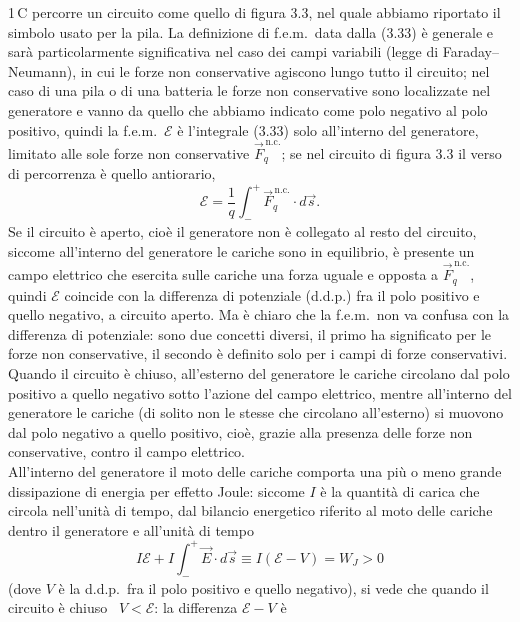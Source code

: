 1\,C percorre un circuito come quello di figura 3.3, nel quale abbiamo riportato
il simbolo usato per la pila.
La definizione di f.e.m.\ data dalla (3.33) \`e generale e sar\`a
particolarmente significativa nel caso dei campi variabili (legge di
Faraday--Neumann), in cui le forze non conservative agiscono lungo tutto il
circuito; nel caso di una pila o di una batteria le forze non conservative sono
localizzate nel generatore e vanno da quello che abbiamo indicato come polo
negativo al polo positivo, quindi la f.e.m.\ $\mathcal E$ \`e l'integrale (3.33)
solo all'interno del generatore, limitato alle sole forze non conservative
$\vec F_q^{\,\mathrm{n.c.}}$; se nel circuito di figura 3.3 il verso di
percorrenza \`e quello antiorario,
\begin{equation}
  \mathcal E=\frac1q\int_-^+\vec F_q^{\,\mathrm{n.c.}}\cdot d\vec s.
  \tag{3.34}
\end{equation}
Se il circuito \`e aperto, cio\`e il generatore non \`e collegato al resto del
circuito, siccome all'interno del generatore le cariche sono in equilibrio, \`e
presente un campo elettrico che esercita sulle cariche una forza uguale e
opposta a $\vec F_q^{\,\mathrm{n.c.}}$, quindi $\mathcal E$ coincide con la
differenza di potenziale (d.d.p.) fra il polo positivo e quello negativo, a
circuito aperto. Ma \`e chiaro che la f.e.m.\ non va confusa con la differenza
di potenziale: sono due concetti diversi, il primo ha significato per le forze
non conservative, il secondo \`e definito solo per i campi di forze
conservativi.
Quando il circuito \`e chiuso, all'esterno del generatore le cariche circolano
dal polo positivo a quello negativo sotto l'azione del campo elettrico, mentre
all'interno del generatore le cariche (di solito non le stesse che circolano
all'esterno) si muovono dal polo negativo a quello positivo, cio\`e, grazie alla
presenza delle forze non conservative, contro il campo elettrico.\\
All'interno del generatore il moto delle cariche comporta una pi\`u o meno
grande dissipazione di energia per effetto Joule: siccome $I$ \`e la quantit\`a
di carica che circola nell'unit\`a di tempo, dal bilancio energetico riferito al
moto delle cariche dentro il generatore e all'unit\`a di tempo
\begin{equation}
  I\mathcal E+I\int_-^+\vec E\cdot d\vec s\equiv I(\mathcal E-V)=W_J>0
  \tag{3.35}
\end{equation}
(dove $V$ \`e la d.d.p.\ fra il polo positivo e quello negativo), si vede che
quando il circuito \`e chiuso \ $V<\mathcal E$: la differenza $\mathcal E-V$ \`e
